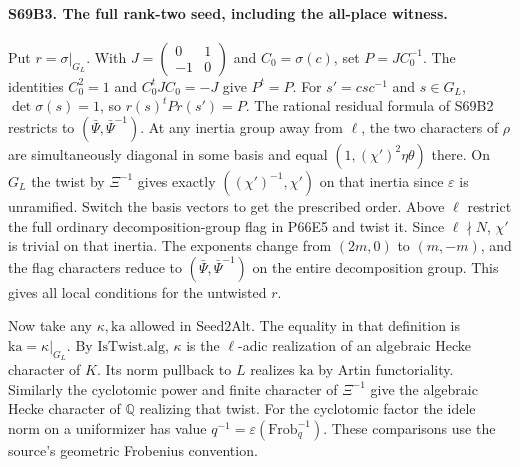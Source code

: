 \paragraph{S69B3. The full rank-two seed, including the all-place witness.}
Put $r=\sigma|_{G_L}$. With
$J=\left(\begin{smallmatrix}0&1\\-1&0\end{smallmatrix}\right)$
and $C_0=\sigma(c)$, set $P=JC_0^{-1}$. The identities
$C_0^2=1$ and $C_0^t J C_0=-J$ give $P^t=P$.
For $s'=csc^{-1}$ and $s\in G_L$, $\det\sigma(s)=1$, so
$r(s)^t P r(s')=P$. The rational residual formula of S69B2
restricts to $(\bar\Psi,\bar\Psi^{-1})$.
At any inertia group away from $\ell$, the two characters of
$\rho$ are simultaneously diagonal in some basis and equal
$(1,(\chi')^2\eta\theta)$ there. On $G_L$ the twist by
$\Xi^{-1}$ gives exactly $((\chi')^{-1},\chi')$ on that
inertia since $\varepsilon$ is unramified. Switch the basis vectors
to get the prescribed order. Above $\ell$ restrict the full
ordinary decomposition-group flag in P66E5 and twist it. Since
$\ell\nmid N$, $\chi'$ is trivial on that inertia. The exponents
change from $(2m,0)$ to $(m,-m)$, and the flag characters reduce
to $(\bar\Psi,\bar\Psi^{-1})$ on the entire decomposition group.
This gives all local conditions for the untwisted $r$.

Now take any $\kappa,\mathrm{ka}$ allowed in $\mathrm{Seed2Alt}$.
The equality in that definition is $\mathrm{ka}=\kappa|_{G_L}$.
By $\mathrm{IsTwist.alg}$, $\kappa$ is the $\ell$-adic realization
of an algebraic Hecke character of $K$. Its norm pullback to $L$
realizes $\mathrm{ka}$ by Artin functoriality. Similarly the
cyclotomic power and finite character of $\Xi^{-1}$ give the
algebraic Hecke character of $\mathbb Q$ realizing that twist.
For the cyclotomic factor the idele norm on a uniformizer has
value $q^{-1}=\varepsilon(\mathrm{Frob}_q^{-1})$.
These comparisons use the source's geometric Frobenius convention.

